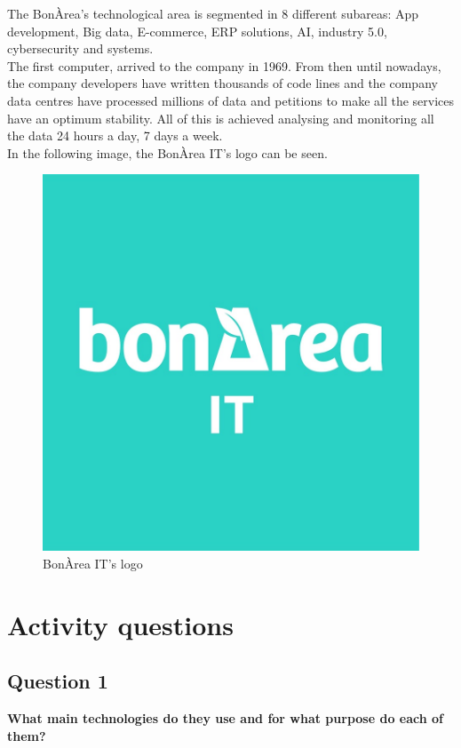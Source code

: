 \documentclass[12pt]{article}
\begin{document}
The BonÀrea's technological area is segmented in 8 different subareas: App development, Big data, E-commerce, ERP solutions, AI, industry 5.0, cybersecurity and systems.\\
The first computer, arrived to the company in 1969. From then until nowadays, the company developers have written thousands of code lines and the company data centres have processed millions of data and petitions to make all the services have an optimum stability. All of this is achieved analysing and monitoring all the data 24 hours a day, 7 days a week.\\
In the following image, the BonÀrea IT's logo can be seen.
\begin{figure}[H]
    \centering
    \includegraphics[scale = 0.2]{Images/bonarea-it.jpg}
    \caption{BonÀrea IT's logo}
    \label{fig:ITlogo}
\end{figure}
\section*{Activity questions}
\subsection*{Question 1}
\textbf{What main technologies do they use and for what purpose do each of them?}
\end{document}
